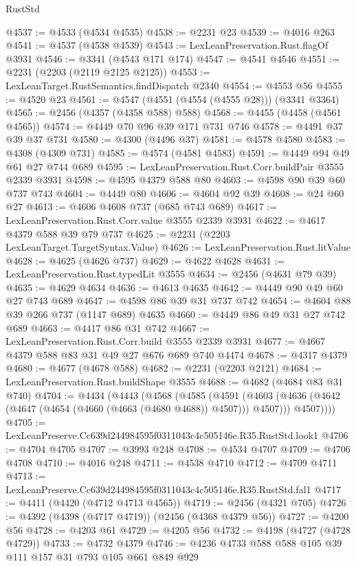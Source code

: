 \begin{lexlean}{RustStd}
\begin{coremodule}
@4537 := @4533 (@4534 @4535)
@4538 := @2231 @23
@4539 := @4016 @263
@4541 := @4537 (@4538 @4539)
@4543 := LexLeanPreservation.Rust.flagOf @3931
@4546 := @3341 (@4543 @171 @174)
@4547 := @4541 @4546
@4551 := @2231 (@2203 (@2119 @2125 @2125))
@4553 := LexLeanTarget.RustSemantics.findDispatch @2340
@4554 := @4553 @56
@4555 := @4520 @23
@4561 := @4547 (@4551 (@4554 (@4555 @28))) (@3341 @3364)
@4565 := @2456 (@4357 (@4358 @588) @588)
@4568 := @4455 (@4458 (@4561 @4565))
@4574 := @4449 @70 @96 @39 @171 @731 @746
@4578 := @4491 @37 @39 @37 @731
@4580 := @4300 (@4496 @37)
@4581 := @4578 @4580
@4583 := @4308 (@4309 @731)
@4585 := @4574 (@4581 @4583)
@4591 := @4449 @94 @49 @61 @27 @744 @689
@4595 := LexLeanPreservation.Rust.Corr.buildPair @3555 @2339 @3931
@4598 := @4595 @4379 @588 @80
@4603 := @4598 @90 @39 @60 @737 @743
@4604 := @4449 @80
@4606 := @4604 @92 @39
@4608 := @24 @60 @27
@4613 := @4606 @4608 @737 (@685 @743 @689)
@4617 := LexLeanPreservation.Rust.Corr.value @3555 @2339 @3931
@4622 := @4617 @4379 @588 @39 @79 @737
@4625 := @2231 (@2203 LexLeanTarget.TargetSyntax.Value)
@4626 := LexLeanPreservation.Rust.litValue
@4628 := @4625 (@4626 @737)
@4629 := @4622 @4628
@4631 := LexLeanPreservation.Rust.typedLit @3555
@4634 := @2456 (@4631 @79 @39)
@4635 := @4629 @4634
@4636 := @4613 @4635
@4642 := @4449 @90 @49 @60 @27 @743 @689
@4647 := @4598 @86 @39 @31 @737 @742
@4654 := @4604 @88 @39 @266 @737 (@1147 @689) @4635
@4660 := @4449 @86 @49 @31 @27 @742 @689
@4663 := @4417 @86 @31 @742
@4667 := LexLeanPreservation.Rust.Corr.build @3555 @2339 @3931
@4677 := @4667 @4379 @588 @83 @31 @49 @27 @676 @689 @740 @4474
@4678 := @4317 @4379
@4680 := @4677 (@4678 @588)
@4682 := @2231 (@2203 @2121)
@4684 := LexLeanPreservation.Rust.buildShape @3555
@4688 := @4682 (@4684 @83 @31 @740)
@4704 := @4434
    (@4443
      (@4568
        (@4585
          (@4591
            (@4603 (@4636 (@4642 (@4647 (@4654 (@4660 (@4663 (@4680 @4688)) @4507))) @4507)))
            @4507))))
@4705 := LexLeanPreserve.Cc639d244984595f0311043c4c505146e.R35.RustStd.look1
@4706 := @4704 @4705
@4707 := @3993 @248
@4708 := @4534 @4707
@4709 := @4706 @4708
@4710 := @4016 @248
@4711 := @4538 @4710
@4712 := @4709 @4711
@4713 := LexLeanPreserve.Cc639d244984595f0311043c4c505146e.R35.RustStd.fal1
@4717 := @4411 (@4420 (@4712 @4713 @4565))
@4719 := @2456 (@4321 @705)
@4726 := @4392 (@4398 (@4717 @4719)) (@2456 (@4368 @4379 @56))
@4727 := @4200 @56
@4728 := @4203 @61
@4729 := @4205 @56
@4732 := @4198 (@4727 (@4728 @4729))
@4733 := @4732 @4379
@4746 := @4236 @4733 @588 @588 @105 @39 @111 @157 @31 @793 @105 @661 @849 @929

\end{coremodule}
\end{lexlean}
